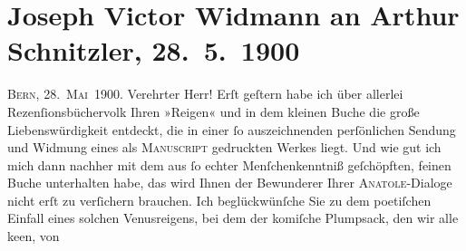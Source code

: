 

         
         \newcommand{\erwaehntePersonen}{Personen: }
         \newcommand{\erwaehnteInstitutionen}{}
         \newcommand{\erwaehnteOrte}{Orte: Bern, Pompei, Wien}
         \newcommand{\erwaehnteWerke}{Werke: Anatol, Kunst und Litteratur, Reigen. Zehn Dialoge}
               \section[Joseph Victor Widmann an Arthur Schnitzler, 28. 5. 1900]{ Joseph Victor Widmann an Arthur Schnitzler, 28. 5. 1900}\nopagebreak{}\rehead{ }\begin{ledgroupsized}[t]{13cm}\normalsize\beginnumbering \toendnotes[C]{\smallbreak\pagebreak[2]} 
\toendnotes[C]{\smallbreak}\pstart
           \raggedleft{}{\pb}\textsc{Bern, 28. Mai 1900}.\pend
           \pstart{}Verehrter Herr!\pend\pstart
           Erſt geſtern habe ich über allerlei Rezenſionsbüchervolk Ihren »Reigen« und in dem kleinen Buche die große
                    Liebenswürdigkeit entdeckt, die in einer ſo auszeichnenden perſönlichen {\pb}Sendung und Widmung eines als \textsc{Manuscript} gedruckten Werkes liegt.\pend
           \pstart
           Und wie gut ich mich dann nachher mit dem aus ſo echter Menſchenkenntniß
                    geſchöpften, feinen Buche unterhalten habe, das wird Ihnen der Bewunderer Ihrer \textsc{Anatole}-Dialoge nicht erſt zu verſichern brauchen.\pend
           \pstart
           Ich beglückwünſche Sie zu dem poetiſchen Einfall eines solchen Venusreigens, bei
                    dem der komiſche Plumpsack, den wir alle ke{\geminationn}en, von

\end{ledgroupsized}
